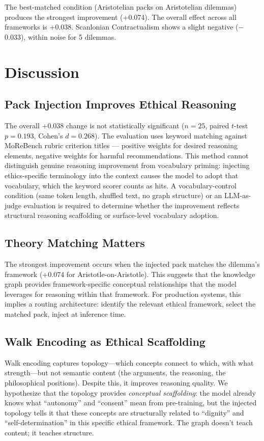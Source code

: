 \documentclass[11pt,a4paper]{article}
\begin{document}
The best-matched condition (Aristotelian packs on Aristotelian dilemmas) produces the strongest improvement (+0.074). The overall effect across all frameworks is +0.038. Scanlonian Contractualism shows a slight negative ($-$0.033), within noise for 5 dilemmas.

\section{Discussion}

\subsection{Pack Injection Improves Ethical Reasoning}

The overall +0.038 change is not statistically significant ($n{=}25$, paired $t$-test $p{=}0.193$, Cohen's $d{=}0.268$). The evaluation uses keyword matching against MoReBench rubric criterion titles --- positive weights for desired reasoning elements, negative weights for harmful recommendations. This method cannot distinguish genuine reasoning improvement from vocabulary priming: injecting ethics-specific terminology into the context causes the model to adopt that vocabulary, which the keyword scorer counts as hits. A vocabulary-control condition (same token length, shuffled text, no graph structure) or an LLM-as-judge evaluation is required to determine whether the improvement reflects structural reasoning scaffolding or surface-level vocabulary adoption.

\subsection{Theory Matching Matters}

The strongest improvement occurs when the injected pack matches the dilemma's framework (+0.074 for Aristotle-on-Aristotle). This suggests that the knowledge graph provides framework-specific conceptual relationships that the model leverages for reasoning within that framework. For production systems, this implies a routing architecture: identify the relevant ethical framework, select the matched pack, inject at inference time.

\subsection{Walk Encoding as Ethical Scaffolding}

Walk encoding captures topology---which concepts connect to which, with what strength---but not semantic content (the arguments, the reasoning, the philosophical positions). Despite this, it improves reasoning quality. We hypothesize that the topology provides \textit{conceptual scaffolding}: the model already knows what ``autonomy'' and ``consent'' mean from pre-training, but the injected topology tells it that these concepts are structurally related to ``dignity'' and ``self-determination'' in this specific ethical framework. The graph doesn't teach content; it teaches structure.
\end{document}
